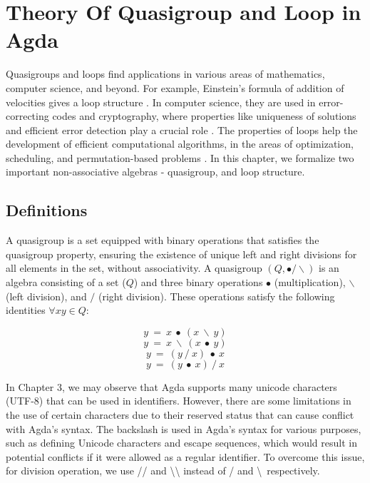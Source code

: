 \chapter{Theory Of Quasigroup and Loop in Agda}
Quasigroups and loops find applications in various areas of mathematics,
computer science, and beyond. For example, Einstein's formula of addition of
velocities gives a loop structure \cite{ungar2007einstein}. In computer science,
they are used in error-correcting codes and cryptography, where properties like
uniqueness of solutions and efficient error detection play a crucial role
\cite{phillips2010automated}. The properties of loops help the development of
efficient computational algorithms, in the areas of optimization, scheduling,
and permutation-based problems \cite{khan2015mining}. In this chapter, we
formalize two important non-associative algebras - quasigroup, and loop
structure.
 
\section{Definitions}
A quasigroup is a set equipped with binary operations that satisfies the
quasigroup property, ensuring the existence of unique left and right divisions
for all elements in the set, without associativity. A quasigroup
$(Q,∙/\backslash)$ is an algebra consisting of a set ($Q$) and three binary
operations $∙$ (multiplication), $\backslash$ (left division), and $/$ (right
division). These operations satisfy the following identities $\forall x y \in
Q$:

\begin{equation} \label{eq_L-leftdivides}
y\ =\ x\ ∙\ (x\ \backslash\ y)
\end{equation}
\begin{equation} \label{eq_L-rightdivides}
y\ =\ x\ \backslash\ (x\ ∙\ y)
\end{equation}
\begin{equation} \label{eq_R-leftdivides}
y\ =\ (y\ /\ x)\ ∙\ x
\end{equation}
\begin{equation} \label{eq_Rirightdivides}
y\ =\ (y\ ∙\ x)\ /\ x
\end{equation}

In Chapter 3, we may observe that Agda supports many unicode characters (UTF-8)
that can be used in identifiers. However, there are some limitations in the use
of certain characters due to their reserved status that can cause conflict with
Agda's syntax. The backslash is used in Agda's syntax for various purposes, such
as defining Unicode characters and escape sequences, which would result in
potential conflicts if it were allowed as a regular identifier. To overcome this
issue, for division operation, we use // and \textbackslash\textbackslash
instead of / and \textbackslash \ respectively.

